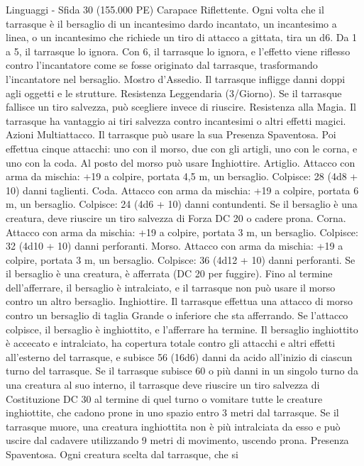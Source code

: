 \begin{multicols}{2}
Linguaggi -
Sfida 30 (155.000 PE)
Carapace Riflettente. Ogni volta che il tarrasque è il bersaglio di
un incantesimo dardo incantato, un incantesimo a linea, o un
incantesimo che richiede un tiro di attacco a gittata, tira un d6.
Da 1 a 5, il tarrasque lo ignora. Con 6, il tarrasque lo ignora, e
l’effetto viene riflesso contro l’incantatore come se fosse
originato dal tarrasque, trasformando l’incantatore nel bersaglio.
Mostro d’Assedio. Il tarrasque infligge danni doppi agli oggetti e
le strutture.
Resistenza Leggendaria (3/Giorno). Se il tarrasque fallisce un
tiro salvezza, può scegliere invece di riuscire.
Resistenza alla Magia. Il tarrasque ha vantaggio ai tiri salvezza
contro incantesimi o altri effetti magici.
Azioni
Multiattacco. Il tarrasque può usare la sua Presenza Spaventosa.
Poi effettua cinque attacchi: uno con il morso, due con gli artigli,
uno con le corna, e uno con la coda. Al posto del morso può
usare Inghiottire.
Artiglio. Attacco con arma da mischia: +19 a colpire, portata 4,5
m, un bersaglio.
Colpisce: 28 (4d8 + 10) danni taglienti.
Coda. Attacco con arma da mischia: +19 a colpire, portata 6 m,
un bersaglio.
Colpisce: 24 (4d6 + 10) danni contundenti. Se il bersaglio è una
creatura, deve riuscire un tiro salvezza di Forza DC 20 o cadere
prona.
Corna. Attacco con arma da mischia: +19 a colpire, portata 3 m,
un bersaglio.
Colpisce: 32 (4d10 + 10) danni perforanti.
Morso. Attacco con arma da mischia: +19 a colpire, portata 3 m,
un bersaglio.
Colpisce: 36 (4d12 + 10) danni perforanti. Se il bersaglio è una
creatura, è afferrata (DC 20 per fuggire). Fino al termine
dell’afferrare, il bersaglio è intralciato, e il tarrasque non può
usare il morso contro un altro bersaglio.
Inghiottire. Il tarrasque effettua una attacco di morso contro un
bersaglio di taglia Grande o inferiore che sta afferrando. Se
l’attacco colpisce, il bersaglio è inghiottito, e l’afferrare ha
termine. Il bersaglio inghiottito è accecato e intralciato, ha
copertura totale contro gli attacchi e altri effetti all’esterno del
tarrasque, e subisce 56 (16d6) danni da acido all’inizio di ciascun
turno del tarrasque.
Se il tarrasque subisce 60 o più danni in un singolo turno da una
creatura al suo interno, il tarrasque deve riuscire un tiro salvezza
di Costituzione DC 30 al termine di quel turno o vomitare tutte le
creature inghiottite, che cadono prone in uno spazio entro 3 metri
dal tarrasque. Se il tarrasque muore, una creatura inghiottita non
è più intralciata da esso e può uscire dal cadavere utilizzando 9
metri di movimento, uscendo prona.
Presenza Spaventosa. Ogni creatura scelta dal tarrasque, che si

\end{multicols}
